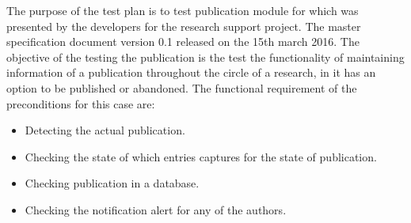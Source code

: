 The purpose of the test plan is to test publication module for which was presented by the developers for the research support project. The master specification document version 0.1 released on the 15th march 2016. The objective of the testing the publication is the test the functionality of maintaining information of a publication throughout the circle of a research, in it has an option to be published or abandoned.
The functional requirement of the preconditions for this case are:

\begin{itemize}
  \item Detecting the actual publication.
  \item Checking the state of which entries captures for the state of publication.
  \item Checking publication in a database.
  \item Checking the notification alert for any of the authors.
\end{itemize}
